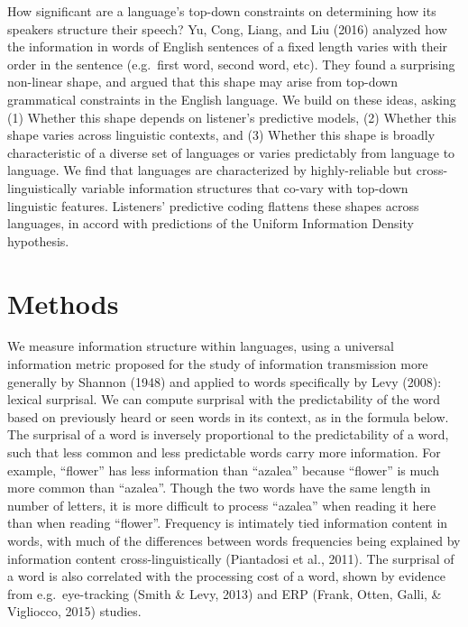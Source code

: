 \documentclass[man,floatsintext]{apa6}
\begin{document}
How significant are a language's top-down constraints on determining how its speakers structure their speech? Yu, Cong, Liang, and Liu (2016) analyzed how the information in words of English sentences of a fixed length varies with their order in the sentence (e.g.~first word, second word, etc). They found a surprising non-linear shape, and argued that this shape may arise from top-down grammatical constraints in the English language. We build on these ideas, asking (1) Whether this shape depends on listener's predictive models, (2) Whether this shape varies across linguistic contexts, and (3) Whether this shape is broadly characteristic of a diverse set of languages or varies predictably from language to language. We find that languages are characterized by highly-reliable but cross-linguistically variable information structures that co-vary with top-down linguistic features. Listeners' predictive coding flattens these shapes across languages, in accord with predictions of the Uniform Information Density hypothesis.

\hypertarget{methods}{%
\section{Methods}\label{methods}}

We measure information structure within languages, using a universal information metric proposed for the study of information transmission more generally by Shannon (1948) and applied to words specifically by Levy (2008): lexical surprisal. We can compute surprisal with the predictability of the word based on previously heard or seen words in its context, as in the formula below. The surprisal of a word is inversely proportional to the predictability of a word, such that less common and less predictable words carry more information. For example, \enquote{flower} has less information than \enquote{azalea} because \enquote{flower} is much more common than \enquote{azalea}. Though the two words have the same length in number of letters, it is more difficult to process \enquote{azalea} when reading it here than when reading \enquote{flower}. Frequency is intimately tied information content in words, with much of the differences between words frequencies being explained by information content cross-linguistically (Piantadosi et al., 2011). The surprisal of a word is also correlated with the processing cost of a word, shown by evidence from e.g.~eye-tracking (Smith \& Levy, 2013) and ERP (Frank, Otten, Galli, \& Vigliocco, 2015) studies.
\end{document}
